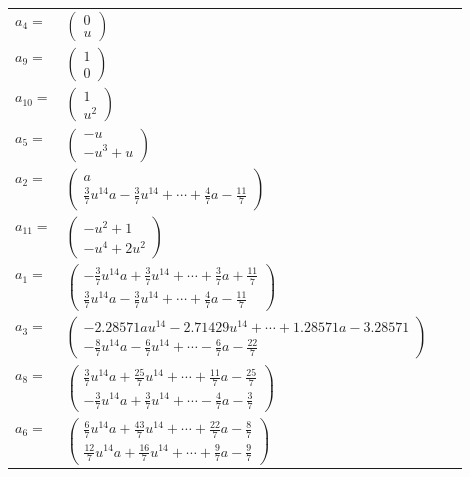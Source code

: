 \documentclass[1p]{elsarticle_modified}
\theoremstyle{definition}
\begin{document}
\begin{tabular}{m{7pt} m{180pt} m{7pt} m{180pt} }
\flushright $a_{4}=$&$\begin{pmatrix}0\\u\end{pmatrix}$ \\
\flushright $a_{9}=$&$\begin{pmatrix}1\\0\end{pmatrix}$ \\
\flushright $a_{10}=$&$\begin{pmatrix}1\\u^2\end{pmatrix}$ \\
\flushright $a_{5}=$&$\begin{pmatrix}- u\\- u^3+u\end{pmatrix}$ \\
\flushright $a_{2}=$&$\begin{pmatrix}a\\\frac{3}{7} u^{14} a-\frac{3}{7} u^{14}+\cdots+\frac{4}{7} a-\frac{11}{7}\end{pmatrix}$ \\
\flushright $a_{11}=$&$\begin{pmatrix}- u^2+1\\- u^4+2 u^2\end{pmatrix}$ \\
\flushright $a_{1}=$&$\begin{pmatrix}-\frac{3}{7} u^{14} a+\frac{3}{7} u^{14}+\cdots+\frac{3}{7} a+\frac{11}{7}\\\frac{3}{7} u^{14} a-\frac{3}{7} u^{14}+\cdots+\frac{4}{7} a-\frac{11}{7}\end{pmatrix}$ \\
\flushright $a_{3}=$&$\begin{pmatrix}-2.28571 a u^{14}-2.71429 u^{14}+\cdots+1.28571 a-3.28571\\-\frac{8}{7} u^{14} a-\frac{6}{7} u^{14}+\cdots-\frac{6}{7} a-\frac{22}{7}\end{pmatrix}$ \\
\flushright $a_{8}=$&$\begin{pmatrix}\frac{3}{7} u^{14} a+\frac{25}{7} u^{14}+\cdots+\frac{11}{7} a-\frac{25}{7}\\-\frac{3}{7} u^{14} a+\frac{3}{7} u^{14}+\cdots-\frac{4}{7} a-\frac{3}{7}\end{pmatrix}$ \\
\flushright $a_{6}=$&$\begin{pmatrix}\frac{6}{7} u^{14} a+\frac{43}{7} u^{14}+\cdots+\frac{22}{7} a-\frac{8}{7}\\\frac{12}{7} u^{14} a+\frac{16}{7} u^{14}+\cdots+\frac{9}{7} a-\frac{9}{7}\end{pmatrix}$ \\

\end{tabular}
\end{document}
